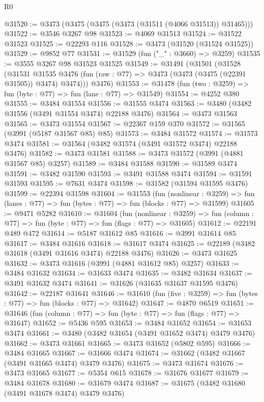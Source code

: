 \begin{lexlean}{R0}
\begin{coremodule}
@31520 := @3473 (@3475 (@3475 (@3473 (@31511 (@4066 @31513)) @31465)))
@31522 := @3546 @3267 @98
@31523 := @4069 @31513
@31524 := @31522 @31523
@31525 := @22293 @116
@31528 := @3473 (@31520 (@31524 @31525))
@31529 := @9852 @77
@31531 := @31529 (fun ("_" : @3660) => @3259)
@31535 := @3555 @3267 @98 @31523 @31525
@31549 := @31491
    (@31501
      (@31528
        (@31531
          @31535
          @3476
          (fun (raw : @77) => @3473 (@3473 (@3475 (@22391 @31505)) @3474) @3474)))
      @3476)
@31553 := @31478 (fun (two : @3259) => fun (byte : @77) => fun (lane : @77) => @31549)
@31554 := @4252 @380
@31555 := @3484 @31554
@31556 := @31555 @3474
@31563 := @3480 (@3482 @31556 (@3491 @31554 @3474) @22188 @3476)
@31564 := @3473 @31563
@31565 := @3473 @31554
@31567 := @22367 @159 @370
@31572 := @31565 (@3991 (@5187 @31567 @85) @85)
@31573 := @3484 @31572
@31574 := @31573 @3474
@31581 := @31564 (@3482 @31574 (@3491 @31572 @3474) @22188 @3476)
@31582 := @3473 @31581
@31588 := @3473 @31572 (@3991 (@4881 @31567 @85) @3257)
@31589 := @3484 @31588
@31590 := @31589 @3474
@31591 := @3482 @31590
@31593 := @3491 @31588 @3474
@31594 := @31591 @31593
@31595 := @7631 @3474
@31598 := @31582 (@31594 @31595 @3476)
@31599 := @22394 @31598
@31604 := @31553
    (fun (nonlinear : @3259) =>
    fun (lanes : @77) => fun (bytes : @77) => fun (blocks : @77) => @31599)
@31605 := @9471 @5282
@31610 := @31604
    (fun (nonlinear : @3259) =>
    fun (column : @77) => fun (byte : @77) => fun (flags : @77) => @31605)
@31612 := @22191 @489 @472
@31614 := @5187 @31612 @85
@31616 := @3991 @31614 @85
@31617 := @3484 @31616
@31618 := @31617 @3474
@31625 := @22189 (@3482 @31618 (@3491 @31616 @3474) @22188 @3476)
@31626 := @3473 @31625
@31632 := @3473 @31616 (@3991 (@4881 @31612 @85) @3257)
@31633 := @3484 @31632
@31634 := @31633 @3474
@31635 := @3482 @31634
@31637 := @3491 @31632 @3474
@31641 := @31626 (@31635 @31637 @31595 @3476)
@31642 := @22187 @31641
@31646 := @31610 (fun (five : @3259) => fun (bytes : @77) => fun (blocks : @77) => @31642)
@31647 := @4870 @6519
@31651 := @31646 (fun (column : @77) => fun (byte : @77) => fun (flags : @77) => @31647)
@31652 := @5436 @595
@31653 := @3484 @31652
@31654 := @31653 @3474
@31661 := @3480 (@3482 @31654 (@3491 @31652 @3474) @3479 @3476)
@31662 := @3473 @31661
@31665 := @3473 @31652 (@5802 @595)
@31666 := @3484 @31665
@31667 := @31666 @3474
@31674 := @31662 (@3482 @31667 (@3491 @31665 @3474) @3479 @3476)
@31675 := @3473 @31674
@31676 := @3473 @31665
@31677 := @5354 @615
@31678 := @31676 @31677
@31679 := @3484 @31678
@31680 := @31679 @3474
@31687 := @31675 (@3482 @31680 (@3491 @31678 @3474) @3479 @3476)

\end{coremodule}
\end{lexlean}
